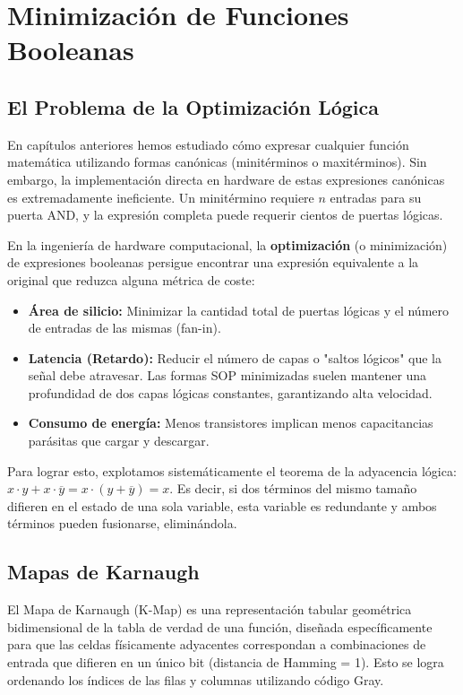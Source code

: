\chapter{Minimización de Funciones Booleanas}

\section{El Problema de la Optimización Lógica}
En capítulos anteriores hemos estudiado cómo expresar cualquier función matemática utilizando formas canónicas (minitérminos o maxitérminos). Sin embargo, la implementación directa en hardware de estas expresiones canónicas es extremadamente ineficiente. Un minitérmino requiere $n$ entradas para su puerta AND, y la expresión completa puede requerir cientos de puertas lógicas. 

En la ingeniería de hardware computacional, la \textbf{optimización} (o minimización) de expresiones booleanas persigue encontrar una expresión equivalente a la original que reduzca alguna métrica de coste:
\begin{itemize}
    \item \textbf{Área de silicio:} Minimizar la cantidad total de puertas lógicas y el número de entradas de las mismas (fan-in).
    \item \textbf{Latencia (Retardo):} Reducir el número de capas o "saltos lógicos" que la señal debe atravesar. Las formas SOP minimizadas suelen mantener una profundidad de dos capas lógicas constantes, garantizando alta velocidad.
    \item \textbf{Consumo de energía:} Menos transistores implican menos capacitancias parásitas que cargar y descargar.
\end{itemize}

Para lograr esto, explotamos sistemáticamente el teorema de la adyacencia lógica: $x \cdot y + x \cdot \overline{y} = x \cdot (y + \overline{y}) = x.$ Es decir, si dos términos del mismo tamaño difieren en el estado de una sola variable, esta variable es redundante y ambos términos pueden fusionarse, eliminándola.

\section{Mapas de Karnaugh}
El Mapa de Karnaugh (K-Map) es una representación tabular geométrica bidimensional de la tabla de verdad de una función, diseñada específicamente para que las celdas físicamente adyacentes correspondan a combinaciones de entrada que difieren en un único bit (distancia de Hamming = 1). Esto se logra ordenando los índices de las filas y columnas utilizando código Gray.

